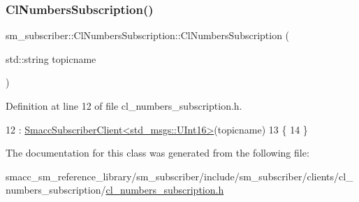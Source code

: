 \subsubsection{\texorpdfstring{Cl\+Numbers\+Subscription()}{ClNumbersSubscription()}}
{\footnotesize\ttfamily sm\+\_\+subscriber\+::\+Cl\+Numbers\+Subscription\+::\+Cl\+Numbers\+Subscription (\begin{DoxyParamCaption}\item[{std\+::string}]{topicname }\end{DoxyParamCaption})\hspace{0.3cm}{\ttfamily [inline]}}



Definition at line 12 of file cl\+\_\+numbers\+\_\+subscription.\+h.


\begin{DoxyCode}
12                                              : 
      \hyperlink{classsmacc_1_1client__bases_1_1SmaccSubscriberClient}{SmaccSubscriberClient<std\_msgs::UInt16>}(topicname)
13   \{
14   \}
\end{DoxyCode}


The documentation for this class was generated from the following file\+:\begin{DoxyCompactItemize}
\item 
smacc\+\_\+sm\+\_\+reference\+\_\+library/sm\+\_\+subscriber/include/sm\+\_\+subscriber/clients/cl\+\_\+numbers\+\_\+subscription/\hyperlink{cl__numbers__subscription_8h}{cl\+\_\+numbers\+\_\+subscription.\+h}\end{DoxyCompactItemize}
